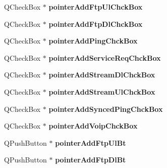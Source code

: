 \begin{DoxyCompactItemize}
\item 
Q\+Check\+Box $\ast$ {\bfseries pointer\+Add\+Ftp\+Ul\+Chck\+Box}\hypertarget{class_custommodels_a5df3a99d3f9a12c2d348fa0eafd89e57}{}\label{class_custommodels_a5df3a99d3f9a12c2d348fa0eafd89e57}

\item 
Q\+Check\+Box $\ast$ {\bfseries pointer\+Add\+Ftp\+Dl\+Chck\+Box}\hypertarget{class_custommodels_a7a28a7d96e8d37727d79575435a6c7d0}{}\label{class_custommodels_a7a28a7d96e8d37727d79575435a6c7d0}

\item 
Q\+Check\+Box $\ast$ {\bfseries pointer\+Add\+Ping\+Chck\+Box}\hypertarget{class_custommodels_ac398e6a7a3b58b55af4937a43f3f216a}{}\label{class_custommodels_ac398e6a7a3b58b55af4937a43f3f216a}

\item 
Q\+Check\+Box $\ast$ {\bfseries pointer\+Add\+Service\+Req\+Chck\+Box}\hypertarget{class_custommodels_a1412412efc31a536e7d8ea9482e9ac4a}{}\label{class_custommodels_a1412412efc31a536e7d8ea9482e9ac4a}

\item 
Q\+Check\+Box $\ast$ {\bfseries pointer\+Add\+Stream\+Dl\+Chck\+Box}\hypertarget{class_custommodels_a2fb2d99de772ac11eac52b822f6cb5f3}{}\label{class_custommodels_a2fb2d99de772ac11eac52b822f6cb5f3}

\item 
Q\+Check\+Box $\ast$ {\bfseries pointer\+Add\+Stream\+Ul\+Chck\+Box}\hypertarget{class_custommodels_a0c35e62f9b87747888a918d63c7f8d36}{}\label{class_custommodels_a0c35e62f9b87747888a918d63c7f8d36}

\item 
Q\+Check\+Box $\ast$ {\bfseries pointer\+Add\+Synced\+Ping\+Chck\+Box}\hypertarget{class_custommodels_a4efd06fe2897931b9a87e8567aacd281}{}\label{class_custommodels_a4efd06fe2897931b9a87e8567aacd281}

\item 
Q\+Check\+Box $\ast$ {\bfseries pointer\+Add\+Voip\+Chck\+Box}\hypertarget{class_custommodels_a72eab9f70fdb698aa4f6499975793905}{}\label{class_custommodels_a72eab9f70fdb698aa4f6499975793905}

\item 
Q\+Push\+Button $\ast$ {\bfseries pointer\+Add\+Ftp\+Ul\+Bt}\hypertarget{class_custommodels_ab57cce29027bf1bd29461fe4bd8c09bb}{}\label{class_custommodels_ab57cce29027bf1bd29461fe4bd8c09bb}

\item 
Q\+Push\+Button $\ast$ {\bfseries pointer\+Add\+Ftp\+Dl\+Bt}\hypertarget{class_custommodels_a64e266521e91109ded21d951edda0338}{}\label{class_custommodels_a64e266521e91109ded21d951edda0338}


\end{DoxyCompactItemize}
